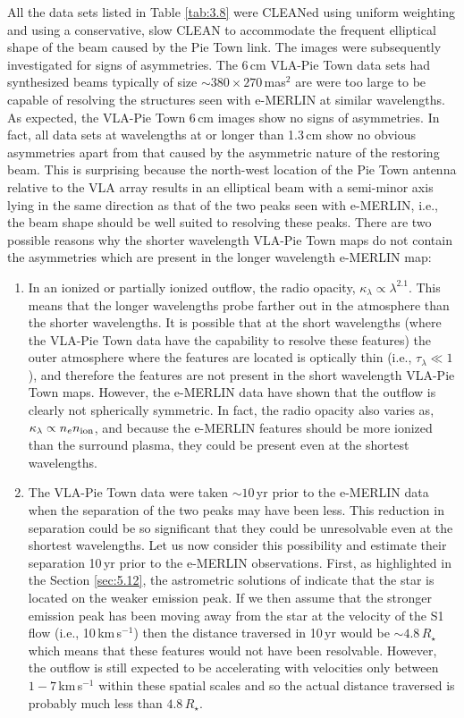 All the data sets listed in Table \ref{tab:3.8} were CLEANed using uniform weighting and using a conservative, slow CLEAN to accommodate the frequent elliptical shape of the beam caused by the Pie Town link. The images were subsequently investigated for signs of asymmetries. The 6\,cm VLA-Pie Town data sets had synthesized beams typically of size $\sim 380\times 270$\,mas$^2$ are were too large to be capable of resolving the structures seen with e-MERLIN at similar wavelengths. As expected, the VLA-Pie Town 6\,cm images show no signs of asymmetries. In fact, all data sets at wavelengths at or longer than 1.3\,cm show no obvious asymmetries apart from that caused by the asymmetric nature of the restoring beam. This is surprising because the north-west location of the Pie Town antenna relative to the VLA array results in an elliptical beam with a semi-minor axis lying in the same direction as that of the two peaks seen with e-MERLIN, i.e., the beam shape should be well suited to resolving these peaks. There are two possible reasons why the shorter wavelength VLA-Pie Town maps do not contain the asymmetries which are present in the longer wavelength e-MERLIN map:
\begin{enumerate}
\item In an ionized or partially ionized outflow, the radio opacity, $\kappa _{\lambda} \propto \lambda ^{2.1}$. This means that the longer wavelengths probe farther out in the atmosphere than the shorter wavelengths. It is possible that at the short wavelengths (where the VLA-Pie Town data have the capability to resolve these features) the outer atmosphere where the features are located is optically thin (i.e., $\tau _{\lambda}\ll 1$), and therefore the features are not present in the short wavelength VLA-Pie Town maps. However, the e-MERLIN data have shown that the outflow is clearly not spherically symmetric. In fact, the radio opacity also varies as, $\kappa _{\lambda} \propto n_{e}n_{\rm{ion}}$, and because the e-MERLIN features should be more ionized than the surround plasma, they could be present even at the shortest wavelengths.
\item The VLA-Pie Town data were taken $\sim 10$\,yr prior to the e-MERLIN data when the separation of the two peaks may have been less. This reduction in separation could be so significant that they could be unresolvable even at the shortest wavelengths. Let us now consider this possibility and estimate their separation  10\,yr prior to the e-MERLIN observations. First, as highlighted in the Section \ref{sec:5.12}, the astrometric solutions of \cite{harper_2008} indicate that the star is located on the weaker emission peak. If we then assume that the stronger emission peak has been moving away from the star at the velocity of the S1 flow (i.e., 10\,km\,s$^{-1}$) then the distance traversed in 10\,yr would be $\sim 4.8\,R_{\star}$ which means that these features would not have been resolvable. However, the outflow is still expected to be accelerating with velocities only between $1-7$\,km\,s$^{-1}$ within these spatial scales \citep{carpenter_1997} and so the actual distance traversed is probably much less than $4.8\,R_{\star}$.
\end{enumerate}

